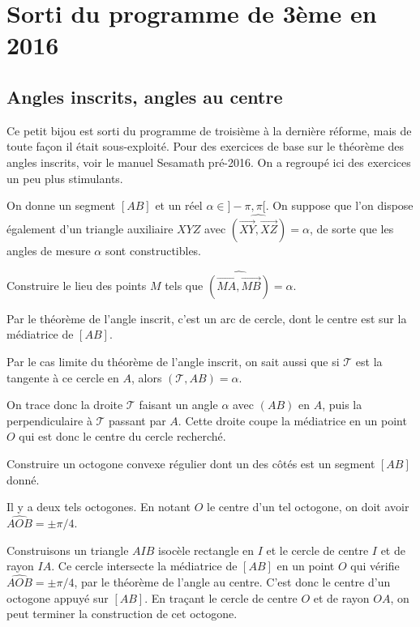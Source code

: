 \section{Sorti du programme de 3ème en 2016}


\subsection{Angles inscrits, angles au centre}

Ce petit bijou est sorti du programme de troisième à la dernière réforme, mais de toute façon il était sous-exploité. Pour des exercices de base sur le théorème des angles inscrits, voir le manuel Sesamath pré-2016. On a regroupé ici des exercices un peu plus stimulants.


\begin{exo}
On donne un segment $[AB]$ et un réel $\alpha \in ]-\pi,\pi[$. On suppose que l'on dispose également d'un triangle auxiliaire $XYZ$ avec $\widehat{(\overrightarrow{XY}, \overrightarrow{XZ})}=\alpha$, de sorte que les angles de mesure $\alpha$ sont constructibles.

 Construire le lieu des points $M$ tels que $\widehat{(\overrightarrow{MA}, \overrightarrow{MB})}=\alpha$.

\begin{sol} 
Par le théorème de l'angle inscrit, c'est un arc de cercle, dont le centre est sur la médiatrice de $[AB]$. 

Par le cas limite du théorème de l'angle inscrit, on sait aussi que si $\mathcal T$ est la tangente à ce cercle en $A$, alors $(\mathcal T,AB)=\alpha$.

On trace donc la droite $\mathcal T$ faisant un angle $\alpha$ avec $(AB)$ en $A$, puis la perpendiculaire à $\mathcal T$ passant par $A$. Cette droite coupe la médiatrice en un point $O$ qui est donc le centre du cercle recherché.
\end{sol}  
\end{exo}  

\begin{exo}
 Construire un octogone convexe régulier dont un des côtés est un segment $[AB]$ donné.

\begin{hint}   
Il y a deux tels octogones. En notant $O$ le centre d'un tel octogone, on doit avoir $\widehat{AOB}=\pm \pi/4$.
\end{hint}      
\begin{sol}  
Construisons un triangle $AIB$ isocèle rectangle en $I$ et le cercle de centre $I$ et de rayon $IA$. Ce cercle intersecte la médiatrice de $[AB]$ en un point $O$ qui vérifie $\widehat{AOB}=\pm \pi/4$, par le théorème de l'angle au centre. C'est donc le centre d'un octogone appuyé sur $[AB]$. En traçant le cercle de centre $O$ et de rayon $OA$, on peut terminer la construction de cet octogone.
\end{sol}  
\end{exo}  

